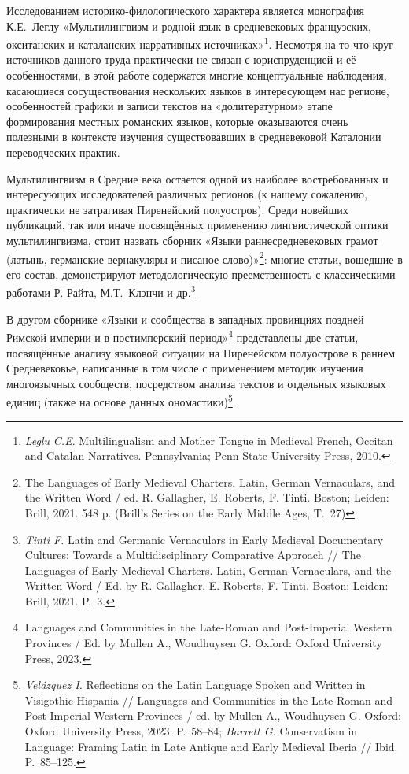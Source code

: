 Исследованием историко-филологического характера является монография К.Е.~Леглу «Мультилингвизм и родной язык в средневековых французских, окситанских и каталанских нарративных источниках»\footnote{\emph{Leglu}\emph{ C.E}. Multilingualism and Mother Tongue in Medieval French, Occitan and Catalan Narratives. Pennsylvania; Penn State University Press, 2010.}. Несмотря на то что круг источников данного труда практически не связан с юриспруденцией и её особенностями, в этой работе содержатся многие концептуальные наблюдения, касающиеся сосуществования нескольких языков в интересующем нас регионе, особенностей графики и записи текстов на «долитературном» этапе формирования местных романских языков, которые оказываются очень полезными в контексте изучения существовавших в средневековой Каталонии переводческих практик.

Мультилингвизм в Средние века остается одной из наиболее востребованных и интересующих исследователей различных регионов (к нашему сожалению, практически не затрагивая Пиренейский полуостров). Среди новейших публикаций, так или иначе посвящённых применению лингвистической оптики мультилингвизма, стоит назвать сборник «Языки раннесредневековых грамот (латынь, германские вернакуляры и писаное слово)»\footnote{The Languages of Early Medieval Charters. Latin, German Vernaculars, and the Written Word / ed. R. Gallagher, E. Roberts, F. Tinti. Boston; Leiden: Brill, 2021. 548 p. (Brill’s Series on the Early Middle Ages, T.~27)}: многие статьи, вошедшие в его состав, демонстрируют методологическую преемственность с классическими работами Р. Райта, М.Т.~Клэнчи и др.\footnote{\emph{Tinti F.} Latin and Germanic Vernaculars in Early Medieval Documentary Cultures: Towards a Multidisciplinary Comparative Approach // The Languages of Early Medieval Charters. Latin, German Vernaculars, and the Written Word / Ed. by R. Gallagher, E. Roberts, F. Tinti. Boston; Leiden: Brill, 2021. P.~3.}

В другом сборнике «Языки и сообщества в западных провинциях поздней Римской империи и в постимперский период»\footnote{Languages and Communities in the Late-Roman and Post-Imperial Western Provinces / Ed. by Mullen A., Woudhuysen G. Oxford: Oxford University Press, 2023.} представлены две статьи, посвящённые анализу языковой ситуации на Пиренейском полуострове в раннем Средневековье, написанные в том числе с применением методик изучения многоязычных сообществ, посредством анализа текстов и отдельных языковых единиц (также на основе данных ономастики)\footnote{\emph{Velázquez I.} Reflections on the Latin Language Spoken and Written in Visigothic Hispania // Languages and Communities in the Late-Roman and Post-Imperial Western Provinces / ed. by Mullen A., Woudhuysen G. Oxford: Oxford University Press, 2023. P.~58--84; \emph{Barrett G.} Conservatism in Language: Framing Latin in Late Antique and Early Medieval Iberia // Ibid. P.~85--125.}.

